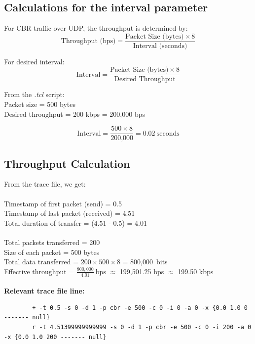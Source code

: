 \documentclass[12pt]{article}
\begin{document}
	
	\section{}
	
	\subsection{Calculations for the interval parameter}
	
	For CBR traffic over UDP, the throughput is determined by: \\
	
	\begin{equation*}
		\text{Throughput (bps)} = \frac{\text{Packet Size (bytes)} \times 8}{\text{Interval (seconds)}}
	\end{equation*}

	\noindent
	For desired interval:
	\begin{equation*}
		\text{Interval} = \frac{\text{Packet Size (bytes)} \times 8}{\text{Desired Throughput}}
	\end{equation*}

	\noindent
	From the \textit{.tcl} script: \\
	Packet size = 500 bytes \\
	Desired throughput = 200 kbps = 200,000 bps
	
	\begin{equation*}
		\text{Interval} = \frac{500 \times 8}{\text{200,000}} = 0.02~\mathrm{seconds}
	\end{equation*}

	
	\subsection{Throughput Calculation}
	From the trace file, we get: \\
	\\
	Timestamp of first packet (send) = 0.5 \\
	Timestamp of last packet (received) = 4.51 \\
	Total duration of transfer = (4.51 - 0.5) = 4.01 \\
	\\
	Total packets transferred = 200 \\
	Size of each packet = 500 bytes \\
	Total data transferred = $200\times500\times8$ = 800,000 bits
	\\
	Effective throughput = $\frac{800,000}{4.01}~\mathrm{bps}$ $\approx$ 199,501.25 bps $\approx$ 199.50 kbps
	\\
	\noindent
	\\
	\textbf{Relevant trace file line:}
	\begin{lstlisting}
		+ -t 0.5 -s 0 -d 1 -p cbr -e 500 -c 0 -i 0 -a 0 -x {0.0 1.0 0 ------- null}
		r -t 4.51399999999999 -s 0 -d 1 -p cbr -e 500 -c 0 -i 200 -a 0 -x {0.0 1.0 200 ------- null}
	\end{lstlisting}
	
\end{document}
